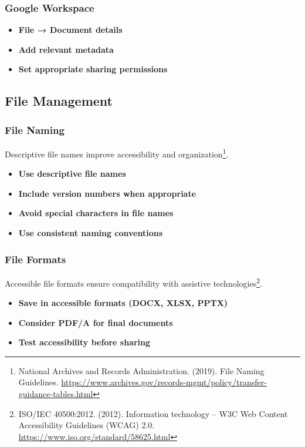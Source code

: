 \subsubsection{Google Workspace}
\vspace{1em}
\begin{itemize}
\item \textbf{File → Document details}
\item \textbf{Add relevant metadata}
\item \textbf{Set appropriate sharing permissions}
\end{itemize}
\vspace{1em}

\subsection{File Management}

\subsubsection{File Naming}
Descriptive file names improve accessibility and organization\footnote{National Archives and Records Administration. (2019). File Naming Guidelines. \url{https://www.archives.gov/records-mgmt/policy/transfer-guidance-tables.html}}.

\begin{itemize}
\item \textbf{Use descriptive file names}
\item \textbf{Include version numbers when appropriate}
\item \textbf{Avoid special characters in file names}
\item \textbf{Use consistent naming conventions}
\end{itemize}

\subsubsection{File Formats}
Accessible file formats ensure compatibility with assistive technologies\footnote{ISO/IEC 40500:2012. (2012). Information technology -- W3C Web Content Accessibility Guidelines (WCAG) 2.0. \url{https://www.iso.org/standard/58625.html}}.

\begin{itemize}
\item \textbf{Save in accessible formats (DOCX, XLSX, PPTX)}
\item \textbf{Consider PDF/A for final documents}
\item \textbf{Test accessibility before sharing}
\end{itemize}

